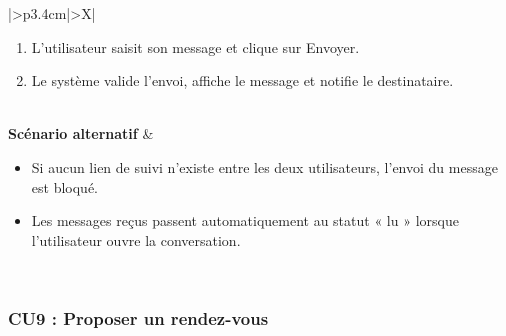 \documentclass[a4paper,12pt]{report}
\begin{document}
\begin{table}[H]
\begin{tabularx}{\textwidth}{|>{\RaggedRight\arraybackslash}p{3.4cm}|>{\RaggedRight\arraybackslash}X|}
\begin{minipage}[t]{\linewidth}
\begin{enumerate}[label=\arabic*., leftmargin=*, topsep=0pt, itemsep=1pt]
    \item L'utilisateur saisit son message et clique sur Envoyer.
    \item Le système valide l'envoi, affiche le message et notifie le destinataire.
\end{enumerate}
\vspace{2pt}
\end{minipage} \\
\hline
\textbf{Scénario alternatif} &
\begin{minipage}[t]{\linewidth}\sloppy
\vspace{2pt}
\begin{itemize}[leftmargin=*, topsep=0pt, itemsep=1pt]
    \item Si aucun lien de suivi n'existe entre les deux utilisateurs, l'envoi du message est bloqué.
    \item  Les messages reçus passent automatiquement au statut « lu » lorsque l'utilisateur ouvre la conversation.
\end{itemize}
\vspace{2pt}
\end{minipage} \\
\hline
\end{tabularx}
\fussy
\end{table}
\endgroup


\begingroup
\setlength{\emergencystretch}{3em}
\subsubsection*{CU9 : Proposer un rendez-vous}
\end{document}
